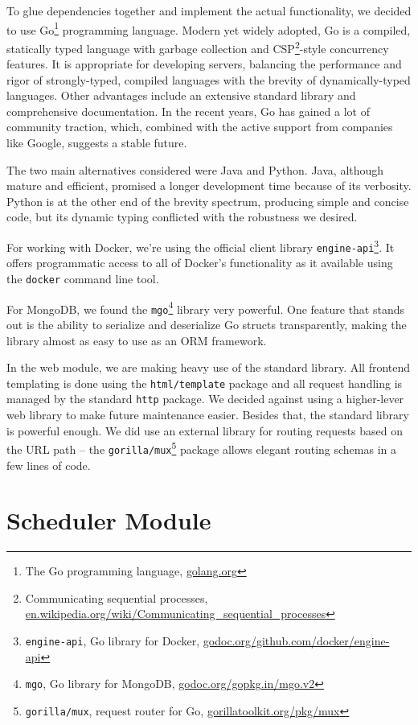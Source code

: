 To glue dependencies together and implement the actual functionality, we decided to use Go\footnote{The Go programming language, \url{golang.org}} programming language. Modern yet widely adopted, Go is a compiled, statically typed language with garbage collection and CSP\footnote{Communicating sequential processes, \url{en.wikipedia.org/wiki/Communicating_sequential_processes}}-style concurrency features. It is appropriate for developing servers, balancing the performance and rigor of strongly-typed, compiled languages with the brevity of dynamically-typed languages. Other advantages include an extensive standard library and comprehensive documentation. In the recent years, Go has gained a lot of community traction, which, combined with the active support from companies like Google, suggests a stable future.

The two main alternatives considered were Java and Python. Java, although mature and efficient, promised a longer development time because of its verbosity. Python is at the other end of the brevity spectrum, producing simple and concise code, but its dynamic typing conflicted with the robustness we desired.

For working with Docker, we're using the official client library \texttt{engine-api}\footnote{\texttt{engine-api}, Go library for Docker, \url{godoc.org/github.com/docker/engine-api}}. It offers programmatic access to all of Docker's functionality as it available using the \texttt{docker} command line tool.

For MongoDB, we found the \texttt{mgo}\footnote{\texttt{mgo}, Go library for MongoDB, \url{godoc.org/gopkg.in/mgo.v2}} library very powerful. One feature that stands out is the ability to serialize and deserialize Go structs transparently, making the library almost as easy to use as an ORM framework.

In the web module, we are making heavy use of the standard library. All frontend templating is done using the \texttt{html/template} package and all request handling is managed by the standard \texttt{http} package. We decided against using a higher-lever web library to make future maintenance easier. Besides that, the standard library is powerful enough. We did use an external library for routing requests based on the URL path -- the \texttt{gorilla/mux}\footnote{\texttt{gorilla/mux}, request router for Go, \url{gorillatoolkit.org/pkg/mux}} package allows elegant routing schemas in a few lines of code.


\section{Scheduler Module}
\label{sec:scheduler-module}

